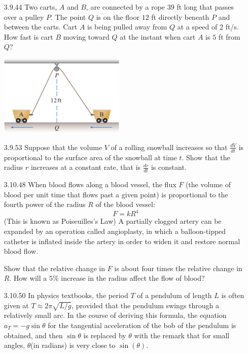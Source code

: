 \documentclass{article}
\begin{document}
\begin{enumerate}
\vspace{6cm}


\item[3.9.44]
    Two carts, $A$ and $B$, are connected by a rope $39$ ft long that passes over a pulley $P$.
    The point $Q$ is on the floor $12$ ft directly beneath $P$ and between the
    carts. Cart $A$ is being pulled away from $Q$ at a speed of $2$ ft/s. How fast is
    cart $B$ moving toward $Q$ at the instant when cart $A$ is $5$ ft from $Q$?

    \begin{center}
        \includegraphics[width=6cm]{./png/3.9.44.png}
    \end{center}

\newpage

\item[3.9.53]
    Suppose that the volume $V$ of a rolling snowball increases so that $\displaystyle \frac{dV}{dt}$ is
    proportional to the surface area of the snowball at time $t$. Show that the radius $r$ increases
    at a constant rate, that is $\displaystyle  \frac{dr}{dt}$ is constant.

\vspace{6cm}

\item[3.10.48]
    When blood flows along a blood vessel, the flux $F$ (the volume of
    blood per unit time that flows past a given point) is proportional
    to the fourth power of the radius $R$ of the blood vessel:
    \[
        F = kR^{4}
    \]
    (This is known as Poiseuilles's Law) A partially clogged artery can be
    expanded by an operation called angioplasty, in which a balloon-tipped
    catheter is inflated inside the artery in order to widen it and restore
    normal blood flow.

    Show that the relative change in $F$ is about four times the relative change
    in $R$. How will a $5$\%  increase in the radius affect the flow of blood?


\newpage

\item[3.10.50]
    In physics textbooks, the period $T$ of a pendulum of length $L$ is
    often given at $T \approx 2 \pi \sqrt{L / g}$, provided that the
    pendulum swings through a relatively small arc. In the course of
    deriving this formula, the equation $a_{T} = -g \sin  \theta  $ for
    the tangential acceleration of the bob of the pendulum is obtained,
    and then $ \sin  \theta   $ is replaced by $ \theta $ with the remark
    that for small angles, $ \theta $(in radians) is very close to
    $ \sin ( \theta  ) $.


\end{enumerate}
\end{document}
